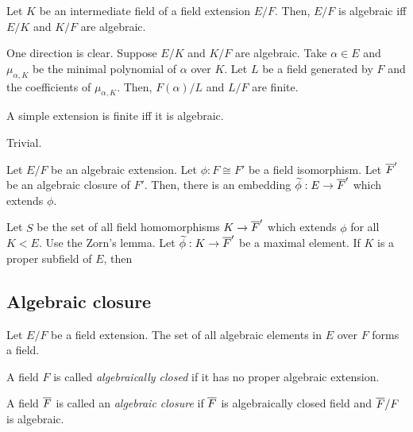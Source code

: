 \documentclass{../exp}
\begin{document}
\begin{thm}
Let $K$ be an intermediate field of a field extension $E/F$.
Then, $E/F$ is algebraic iff $E/K$ and $K/F$ are algebraic.
\end{thm}
\begin{pf}
One direction is clear.
Suppose $E/K$ and $K/F$ are algebraic.
Take $\alpha\in E$ and $\mu_{\alpha,K}$ be the minimal polynomial of $\alpha$ over $K$.
Let $L$ be a field generated by $F$ and the coefficients of $\mu_{\alpha,K}$.
Then, $F(\alpha)/L$ and $L/F$ are finite.
\end{pf}

\begin{prop}
A simple extension is finite iff it is algebraic.
\end{prop}
\begin{pf} Trivial. \end{pf}

\begin{thm}
Let $E/F$ be an algebraic extension.
Let $\phi:F\cong F'$ be a field isomorphism.
Let $\overline F'$ be an algebraic closure of $F'$.
Then, there is an embedding $\tld\phi:E\to\cl F'$ which extends $\phi$.
\end{thm}
\begin{pf}
Let $S$ be the set of all field homomorphisms $K\to\cl F'$ which extends $\phi$ for all $K<E$.
Use the Zorn's lemma.
Let $\tld\phi:K\to\cl F'$ be a maximal element.
If $K$ is a proper subfield of $E$, then
\end{pf}






\subsection{Algebraic closure}

\begin{thm}
Let $E/F$ be a field extension.
The set of all algebraic elements in $E$ over $F$ forms a field.
\end{thm}
\begin{pf}
\end{pf}




\begin{defn}
A field $F$ is called \emph{algebraically closed} if it has no proper algebraic extension.
\end{defn}

\begin{defn}
A field $\overline F$ is called an \emph{algebraic closure} if $\overline F$ is algebraically closed field and $\overline F/F$ is algebraic.
\end{defn}
\end{document}
